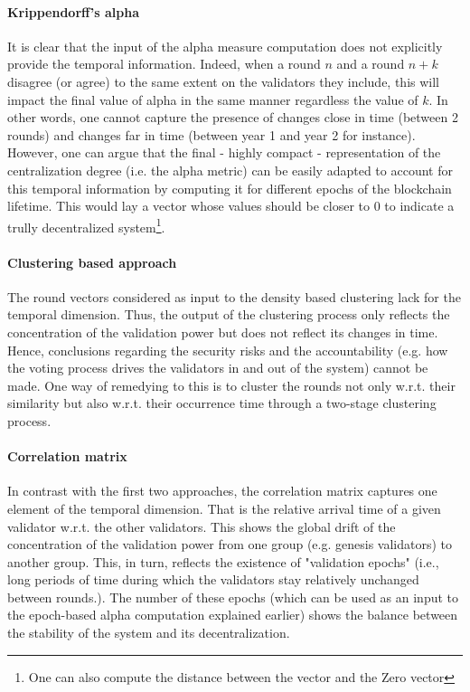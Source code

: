\documentclass{article}
\begin{document}
\paragraph{Krippendorff's alpha} It is clear that the input of the alpha measure computation does not explicitly provide the temporal information. Indeed, when a round $n$ and a round $n + k$ disagree (or agree) to the same extent on the validators they include, this will impact the final value of alpha in the same manner regardless the value of $k$. In other words, one cannot capture the presence of changes close in time (between 2 rounds) and changes far in time (between year 1 and year 2 for instance). However, one can argue that the final - highly compact - representation of the centralization degree (i.e. the alpha metric) can be easily adapted to account for this temporal information by computing it for different epochs of the blockchain lifetime. This would lay a vector whose values should be closer to 0 to indicate a trully decentralized system\footnote{One can also compute the distance between the vector and the Zero vector}.

\paragraph{Clustering based approach} The round vectors considered as input to the density based clustering lack for the temporal dimension. Thus, the output of the clustering process only reflects the concentration of the validation power but does not reflect its changes in time. Hence, conclusions regarding the security risks and the accountability (e.g. how the voting process drives the validators in and out of the system) cannot be made. One way of remedying to this is to cluster the rounds not only w.r.t. their similarity but also w.r.t. their occurrence time through a two-stage clustering process.

\paragraph{Correlation matrix} In contrast with the first two approaches, the correlation matrix captures one element of the temporal dimension. That is the relative arrival time of a given validator w.r.t. the other validators. This shows the global drift of the concentration of the validation power from one group (e.g. genesis validators) to another group. This, in turn, reflects the existence of "validation epochs" (i.e., long periods of time during which the validators stay relatively unchanged between rounds.). The number of these epochs (which can be used as an input to the epoch-based alpha computation explained earlier) shows the balance between the stability of the system and its decentralization.  
\end{document}
